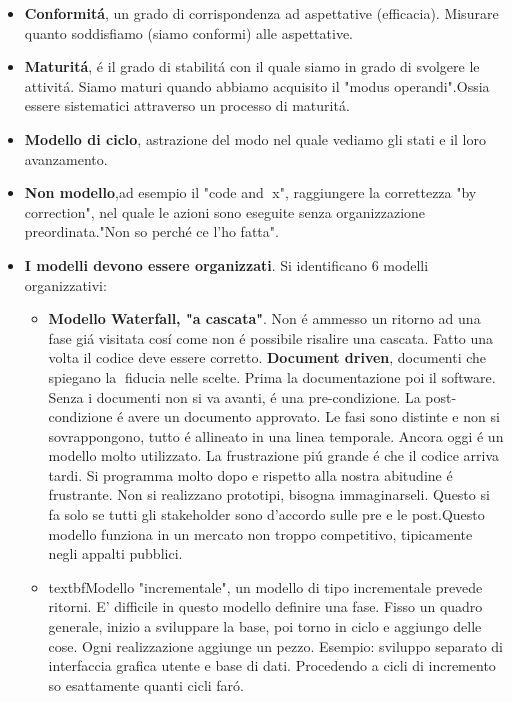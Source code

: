 \documentclass[10pt]{article}
\begin{document}
\begin{itemize}
\begin{itemize}
	
	\item \textbf{Conformit\'a}, un grado di corrispondenza ad aspettative 
	(efficacia). Misurare quanto soddisfiamo (siamo conformi) alle aspettative.
	
	\item \textbf{Maturit\'a}, \'e il grado di stabilit\'a con il quale siamo 
	in grado di svolgere le attivit\'a. Siamo maturi quando abbiamo acquisito 
	il "modus operandi".Ossia essere sistematici attraverso un processo di 
	maturit\'a.
	
	\item \textbf{Modello di ciclo}, astrazione del modo nel quale vediamo gli 
	stati e il loro avanzamento.
	
	\item \textbf{Non modello},ad esempio il "code and x", raggiungere la 
	correttezza "by correction", nel quale le azioni sono eseguite senza 
	organizzazione preordinata."Non so perch\'e ce l'ho fatta".
	
	\item \textbf{I modelli devono essere organizzati}. Si identificano 6 
	modelli organizzativi:
	\begin{itemize}
	\item  \textbf{Modello Waterfall, "a cascata"}. Non \'e ammesso un ritorno 
	ad una fase gi\'a visitata cos\'i come non \'e possibile risalire una 
	cascata. Fatto una volta il codice deve essere corretto. 	
	\textbf{Document driven}, documenti che spiegano la fiducia nelle 
	scelte. Prima la documentazione poi il software. Senza i documenti
	non si va avanti, \'e una pre-condizione. La post-condizione \'e avere un 
	documento approvato. Le fasi sono distinte e non si sovrappongono, tutto 
	\'e allineato in una linea temporale. Ancora oggi \'e un modello
	molto utilizzato. La frustrazione pi\'u grande \'e che il codice arriva 
	tardi. Si programma molto dopo e rispetto alla nostra abitudine \'e 
	frustrante. Non si realizzano  prototipi, bisogna immaginarseli.
	Questo si fa solo se tutti gli stakeholder sono d'accordo sulle pre e le 
	post.Questo modello funziona in un mercato non troppo competitivo, 
	tipicamente negli appalti pubblici.


	\item textbf{Modello "incrementale"}, un modello di tipo incrementale 
	prevede ritorni. E' difficile in questo modello definire una fase.
	Fisso un quadro generale, inizio a sviluppare la base, poi torno in ciclo e 
	aggiungo delle cose. Ogni realizzazione aggiunge un pezzo. Esempio: 
	sviluppo separato di interfaccia grafica utente e base di dati. Procedendo 
	a cicli di incremento so esattamente quanti cicli far\'o. 
	

\end{itemize}
\end{itemize}
\end{itemize}
\end{document}
